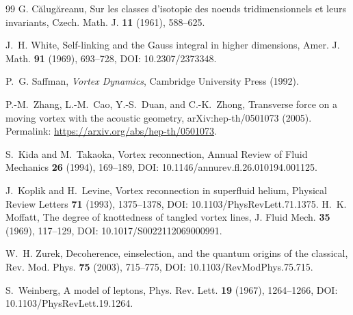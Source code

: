 \documentclass[11pt]{article}
\theoremstyle{definition}
\theoremstyle{plain}
\theoremstyle{remark}
\begin{document}
\begin{thebibliography}{99}
            G. C\u{a}lug\u{a}reanu,
            \newblock Sur les classes d'isotopie des noeuds tridimensionnels et leurs invariants,
            \newblock Czech. Math. J. \textbf{11} (1961), 588--625.

            J.~H. White,
            \newblock Self-linking and the Gauss integral in higher dimensions,
            \newblock Amer. J. Math. \textbf{91} (1969), 693--728,
            \newblock DOI: 10.2307/2373348.

            P.~G. Saffman,
            \newblock \emph{Vortex Dynamics},
            \newblock Cambridge University Press (1992).

            P.-M.~Zhang, L.-M.~Cao, Y.-S.~Duan, and C.-K.~Zhong,
            \newblock Transverse force on a moving vortex with the acoustic geometry,
            \newblock arXiv:hep-th/0501073 (2005).
            \newblock Permalink: \url{https://arxiv.org/abs/hep-th/0501073}.


            S.~Kida and M.~Takaoka,
            \newblock Vortex reconnection,
            \newblock Annual Review of Fluid Mechanics \textbf{26} (1994), 169--189,
            \newblock DOI: 10.1146/annurev.fl.26.010194.001125.

            J.~Koplik and H.~Levine,
            \newblock Vortex reconnection in superfluid helium,
            \newblock Physical Review Letters \textbf{71} (1993), 1375--1378,
            \newblock DOI: 10.1103/PhysRevLett.71.1375.
            H.~K. Moffatt,
            \newblock The degree of knottedness of tangled vortex lines,
            \newblock J. Fluid Mech. \textbf{35} (1969), 117--129,
            \newblock DOI: 10.1017/S0022112069000991.

            W.~H. Zurek,
            \newblock Decoherence, einselection, and the quantum origins of the classical,
            \newblock Rev. Mod. Phys. \textbf{75} (2003), 715--775,
            \newblock DOI: 10.1103/RevModPhys.75.715.

            S.~Weinberg,
            \newblock A model of leptons,
            \newblock Phys. Rev. Lett. \textbf{19} (1967), 1264--1266,
            \newblock DOI: 10.1103/PhysRevLett.19.1264.


\end{thebibliography}
\end{document}
